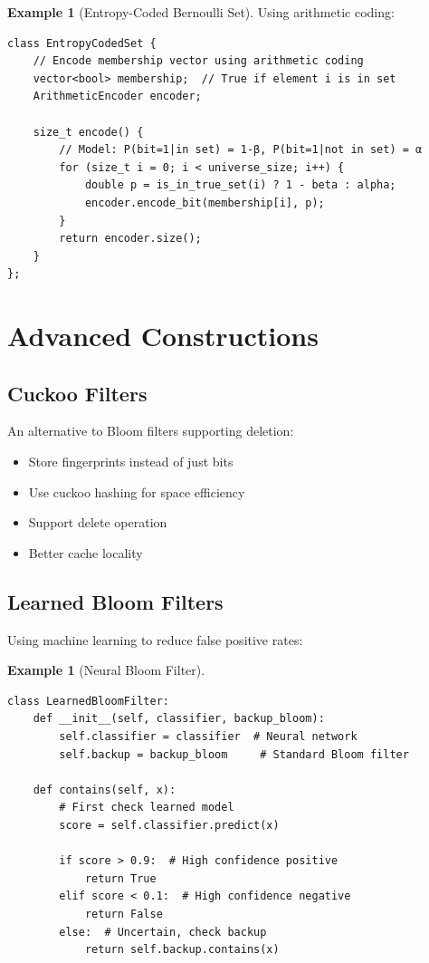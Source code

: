 \documentclass[11pt,twoside,openright]{book}
\theoremstyle{definition}
\newtheorem{example}[definition]{Example}
\theoremstyle{plain}
\theoremstyle{remark}
\begin{document}
\begin{example}[Entropy-Coded Bernoulli Set]
Using arithmetic coding:
\begin{verbatim}
class EntropyCodedSet {
    // Encode membership vector using arithmetic coding
    vector<bool> membership;  // True if element i is in set
    ArithmeticEncoder encoder;
    
    size_t encode() {
        // Model: P(bit=1|in set) = 1-β, P(bit=1|not in set) = α
        for (size_t i = 0; i < universe_size; i++) {
            double p = is_in_true_set(i) ? 1 - beta : alpha;
            encoder.encode_bit(membership[i], p);
        }
        return encoder.size();
    }
};
\end{verbatim}
\end{example}

\section{Advanced Constructions}

\subsection{Cuckoo Filters}

An alternative to Bloom filters supporting deletion:

\begin{itemize}
    \item Store fingerprints instead of just bits
    \item Use cuckoo hashing for space efficiency
    \item Support delete operation
    \item Better cache locality
\end{itemize}

\subsection{Learned Bloom Filters}

Using machine learning to reduce false positive rates:

\begin{example}[Neural Bloom Filter]
\begin{verbatim}
class LearnedBloomFilter:
    def __init__(self, classifier, backup_bloom):
        self.classifier = classifier  # Neural network
        self.backup = backup_bloom     # Standard Bloom filter
        
    def contains(self, x):
        # First check learned model
        score = self.classifier.predict(x)
        
        if score > 0.9:  # High confidence positive
            return True
        elif score < 0.1:  # High confidence negative
            return False
        else:  # Uncertain, check backup
            return self.backup.contains(x)
\end{verbatim}
\end{example}
\end{document}
